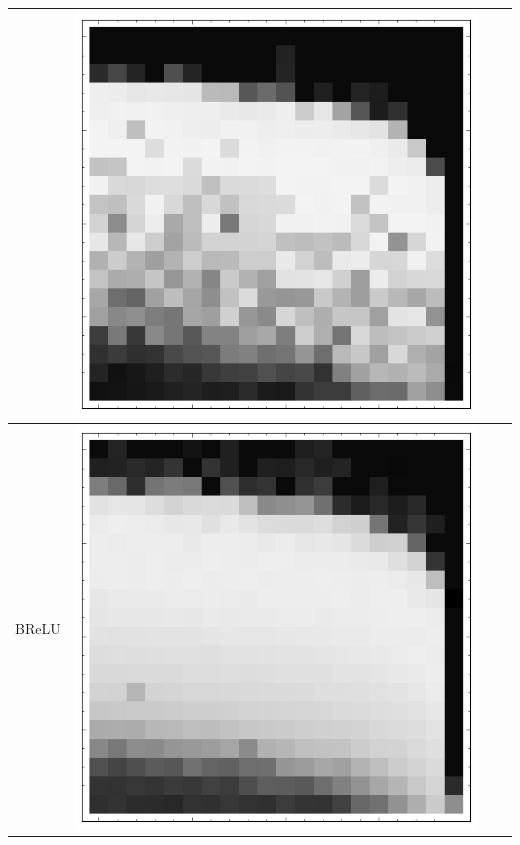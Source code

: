 \documentclass[10pt]{article}
\begin{document}
\begin{tabular}{|c|c|c|c|}
        & \includegraphics[scale=0.25]{plots/simple/LF-40R20R10R-20T10-MNIST-6.png} \\ \hline
BReLU 
        & \includegraphics[scale=0.25]{plots/simple/LF-20B10B-20T10-MNIST-6.png}

\end{tabular}
\end{document}
